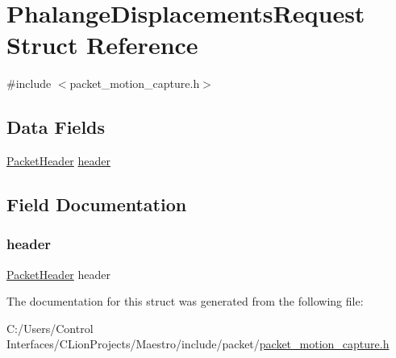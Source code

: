 \hypertarget{struct_phalange_displacements_request}{}\section{Phalange\+Displacements\+Request Struct Reference}
\label{struct_phalange_displacements_request}


{\ttfamily \#include $<$packet\+\_\+motion\+\_\+capture.\+h$>$}

\subsection*{Data Fields}
\begin{DoxyCompactItemize}
\item 
\hyperlink{struct_packet_header}{Packet\+Header} \hyperlink{struct_phalange_displacements_request_aaed6c168c58cb4f203b7f5623775d739}{header}
\end{DoxyCompactItemize}


\subsection{Field Documentation}
\mbox{\label{struct_phalange_displacements_request_aaed6c168c58cb4f203b7f5623775d739}} 
\subsubsection{\texorpdfstring{header}{header}}
{\footnotesize\ttfamily \hyperlink{struct_packet_header}{Packet\+Header} header}



The documentation for this struct was generated from the following file\+:\begin{DoxyCompactItemize}
\item 
C\+:/\+Users/\+Control Interfaces/\+C\+Lion\+Projects/\+Maestro/include/packet/\hyperlink{packet__motion__capture_8h}{packet\+\_\+motion\+\_\+capture.\+h}\end{DoxyCompactItemize}
